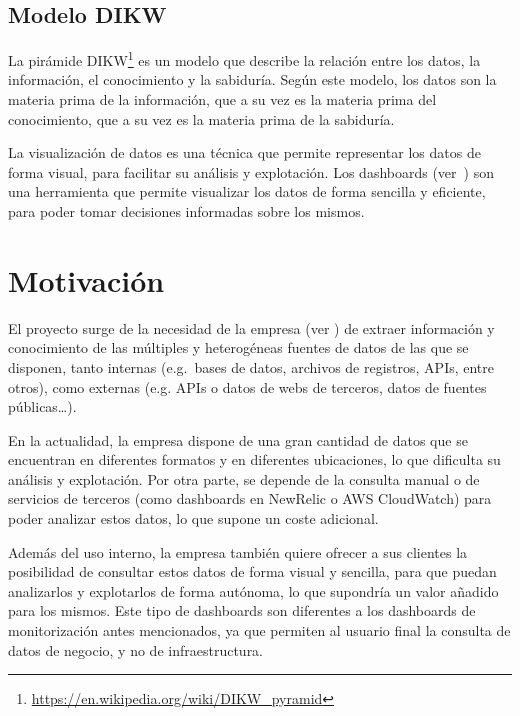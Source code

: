 \subsection{Modelo DIKW}\label{subsec:dikw}
La pirámide DIKW\footnote{\url{https://en.wikipedia.org/wiki/DIKW_pyramid}} es un modelo que
describe la relación entre los datos, la información, el conocimiento y la sabiduría. Según este
modelo, los datos son la materia prima de la información, que a su vez es la materia prima del
conocimiento, que a su vez es la materia prima de la sabiduría.

La visualización de datos es una técnica que permite representar los datos de forma visual, para
facilitar su análisis y explotación. Los dashboards (ver~) son una
herramienta que permite visualizar los datos de forma sencilla y eficiente, para poder tomar
decisiones informadas sobre los mismos.

\newpage{}

\section{Motivación}\label{sec:motivacion}
El proyecto surge de la necesidad de la empresa (ver ) de extraer información
y conocimiento de las múltiples y heterogéneas fuentes de datos de las que se disponen,
tanto internas (e.g.~bases de datos, archivos de registros, APIs, entre otros),
como externas (e.g. APIs o datos de webs de terceros, datos de fuentes públicas\ldots).

En la actualidad, la empresa dispone de una gran cantidad de datos que se encuentran en
diferentes formatos y en diferentes ubicaciones, lo que dificulta su análisis y explotación.
Por otra parte, se depende de la consulta manual o de servicios de terceros (como dashboards
en NewRelic o AWS CloudWatch) para poder analizar estos datos, lo que supone un coste adicional.

Además del uso interno, la empresa también quiere ofrecer a sus clientes la posibilidad de
consultar estos datos de forma visual y sencilla, para que puedan analizarlos y explotarlos de
forma autónoma, lo que supondría un valor añadido para los mismos. Este tipo de dashboards
son diferentes a los dashboards de monitorización antes mencionados, ya que permiten al usuario
final la consulta de datos de negocio, y no de infraestructura.

